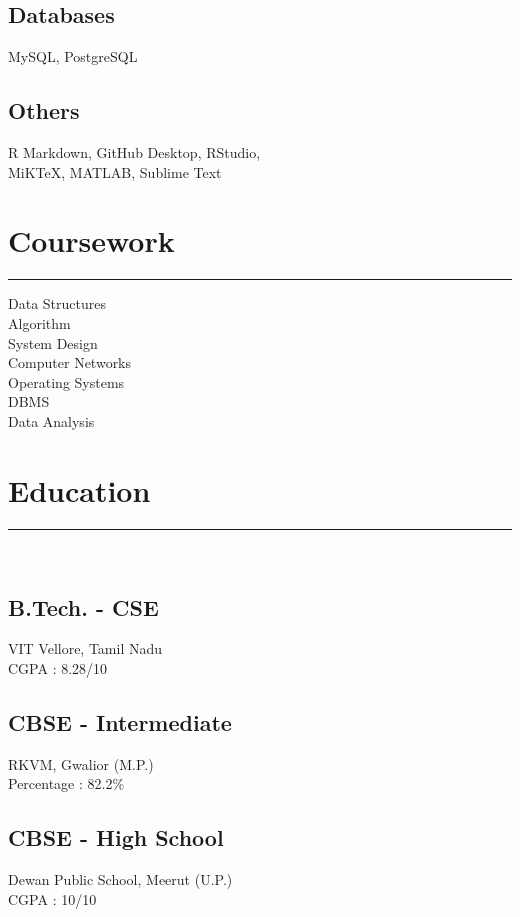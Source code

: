 \documentclass[]{meetresume-class}
\begin{document}
\begin{minipage}[t]{0.33\textwidth}
		\subsection{Databases}
		MySQL, PostgreSQL
		\vspace{6pt}
		
		\subsection{Others}
		R Markdown, GitHub Desktop, RStudio,\\
		MiKTeX, MATLAB, Sublime Text
		\sectionsep
		\section{Coursework}
		\noindent\rule{5cm}{0.6pt}
		
		Data Structures\\
		Algorithm\\
		System Design\\
		Computer Networks\\
		Operating Systems\\
		DBMS\\
		Data Analysis
		\sectionsep
		\section{Education} 
		\noindent\rule{5cm}{0.6pt}\\
		\subsection{B.Tech. - CSE}
		VIT Vellore, Tamil Nadu \\
		CGPA : 8.28/10\\
		\vspace{8pt}
		\subsection{CBSE - Intermediate}
		RKVM, Gwalior (M.P.)\\
		Percentage : 82.2\%\\
		\vspace{8pt}
		\subsection{CBSE - High School}
		Dewan Public School, Meerut (U.P.)\\
		CGPA : 10/10
		\sectionsep

\end{minipage}
\end{document}
